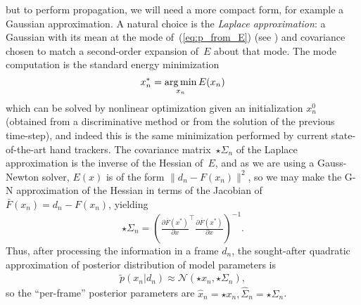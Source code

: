 but to perform propagation, we will need a more compact form, for example a Gaussian approximation.   A natural choice is the \emph{Laplace approximation}: a Gaussian with its mean at the mode of~(\ref{eq:p_from_E}) (see ) and covariance chosen to match a second-order expansion of~$E$ about that mode. 
The mode computation is the standard energy minimization
\begin{equation}
{x}^*_n = \operatorname*{arg\,min}_{x_n} E(x_n)
\label{eq:xmin}
\end{equation}
which can be solved by nonlinear optimization given an initialization $x_n^0$ (obtained from a discriminative method or from the solution of the previous time-step), and indeed this is the same minimization performed by current state-of-the-art hand trackers.
The covariance matrix~$\star\Sigma_n$ of the Laplace approximation is the inverse of the Hessian of~$E$, and as we are using a Gauss-Newton solver, $E(x)$ is of the form $\|d_n - F(x_n)\|^2$, so we may make the G-N approximation of the Hessian in terms of the Jacobian of~
$\bar{F}(x_n) = d_n - F(x_n)$, yielding
\begin{equation}
{\star{\Sigma}_n} = \left(\tfrac{\partial \bar{F}(x^*)}{\partial x}^\top \tfrac{\partial \bar{F}(x^*)}{\partial x}\right)^{-1}.
\end{equation}
Thus, after processing the information in a frame $d_n$, the sought-after quadratic approximation of posterior distribution of model parameters is 
\begin{align}
\tilde{p}(x_n|d_n) \approx \mathcal{N}\left(\star{x}_n, \star{\Sigma}_n \right),
\end{align}
so the ``per-frame'' posterior parameters are $\hat x_n = \star x_n, \hat\Sigma_n = \star\Sigma_n$.


%

